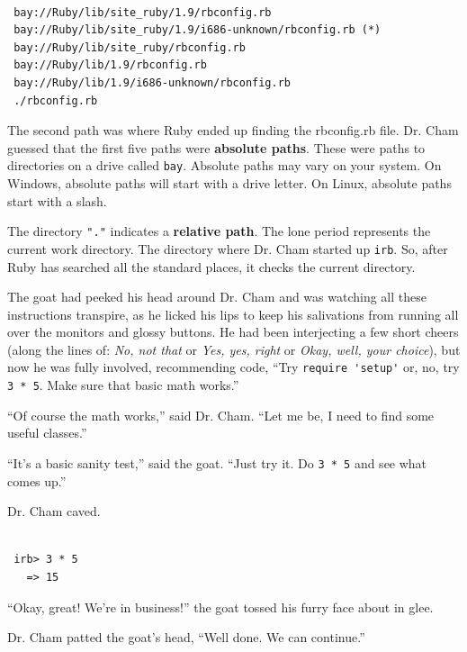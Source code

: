\documentclass[10pt,twoside]{report}
\begin{document}
\begin{lstlisting}

 bay://Ruby/lib/site_ruby/1.9/rbconfig.rb
 bay://Ruby/lib/site_ruby/1.9/i686-unknown/rbconfig.rb (*)
 bay://Ruby/lib/site_ruby/rbconfig.rb
 bay://Ruby/lib/1.9/rbconfig.rb
 bay://Ruby/lib/1.9/i686-unknown/rbconfig.rb
 ./rbconfig.rb

\end{lstlisting}


The second path was where Ruby ended up finding the rbconfig.rb file.
Dr. Cham guessed that the first five paths were {\bf absolute paths}.
These were paths to directories on a drive called
\lstinline[breaklines=true]|bay|.  Absolute paths may vary on your
system.  On Windows, absolute paths will start with a drive letter.
On Linux, absolute paths start with a slash.

The directory \lstinline[breaklines=true]|"."| indicates a {\bf
  relative path}.  The lone period represents the current work
directory.  The directory where Dr. Cham started up
\lstinline[breaklines=true]|irb|.  So, after Ruby has searched all the
standard places, it checks the current directory.

The goat had peeked his head around Dr. Cham and was watching all
these instructions transpire, as he licked his lips to keep his
salivations from running all over the monitors and glossy buttons.  He
had been interjecting a few short cheers (along the lines of: {\em No,
  not that} or {\em Yes, yes, right} or {\em Okay, well, your
  choice}), but now he was fully involved, recommending code, ``Try
\lstinline[breaklines=true]|require 'setup'| or, no, try
\lstinline[breaklines=true]|3 * 5|.  Make sure that basic math
works.''

``Of course the math works,'' said Dr. Cham.  ``Let me be, I need to
find some useful classes.''

``It's a basic sanity test,'' said the goat.  ``Just try it.  Do
\lstinline[breaklines=true]|3 * 5| and see what comes up.''

Dr. Cham caved.


\begin{lstlisting}

 irb> 3 * 5
   => 15

\end{lstlisting}


``Okay, great!  We're in business!'' the goat tossed his furry face
about in glee.

Dr. Cham patted the goat's head, ``Well done.  We can continue.''
\end{document}
